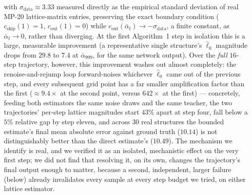 \documentclass{article}
\begin{document}
with $\sigma_{\text{data}} \approx 3.33$ measured directly as the empirical standard deviation of real MP-20 lattice-matrix entries, preserving the exact boundary condition ($c_{\text{skip}}(1){=}1$, $c_{\text{out}}(1){=}0$) while $c_{\text{out}}(\bar\alpha_t) \to -\sigma_{\text{data}}$, a finite constant, as $\bar\alpha_t \to 0$, rather than diverging. At the first Algorithm~1 step in isolation this is a large, measurable improvement (a representative single structure's $\hat\ell_0$ magnitude drops from $29.8$ to $7.4$ at $\bar\alpha_{999}$, for the same network output). Over the \emph{full} $16$-step trajectory, however, this improvement washes out almost completely: the renoise-and-rejump loop forward-noises whichever $\hat\ell_0$ came out of the previous step, and every subsequent grid point has a far smaller amplification factor than the first ($\approx 9.4\times$ at the second point, versus $642\times$ at the first) --- concretely, feeding both estimators the same noise draws and the same teacher, the two trajectories' per-step lattice magnitudes start $43\%$ apart at step four, fall below a $5\%$ relative gap by step eleven, and across $30$ real structures the bounded estimate's final mean absolute error against ground truth ($10.14$) is not distinguishably better than the direct estimate's ($10.49$). The mechanism we identify is real, and we verified it as an isolated, mechanistic effect on the very first step; we did not find that resolving it, on its own, changes the trajectory's final output enough to matter, because a second, independent, larger failure (below) already invalidates every sample at every step budget we tried, on either lattice estimator.
\end{document}
